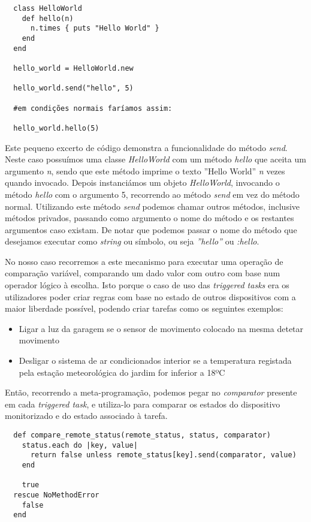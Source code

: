 \begin{verbatim}
  class HelloWorld
    def hello(n)
      n.times { puts "Hello World" }
    end
  end

  hello_world = HelloWorld.new

  hello_world.send("hello", 5)
  
  #em condições normais faríamos assim:
  
  hello_world.hello(5)
\end{verbatim}

Este pequeno excerto de código demonstra a funcionalidade do método \textit{send}. Neste caso possuímos uma classe \textit{HelloWorld} com um método \textit{hello} que aceita um argumento \textit{n}, sendo que este método imprime o texto ''Hello World'' \textit{n} vezes quando invocado. Depois instanciámos um objeto \textit{HelloWorld}, invocando o método \textit{hello} com o argumento 5, recorrendo ao método \textit{send} em vez do método normal. Utilizando este método \textit{send} podemos chamar outros métodos, inclusive métodos privados, passando como argumento o nome do método e os restantes argumentos caso existam. De notar que podemos passar o nome do método que desejamos executar como \textit{string} ou símbolo, ou seja \textit{''hello''} ou \textit{:hello}.

No nosso caso recorremos a este mecanismo para executar uma operação de comparação variável, comparando um dado valor com outro com base num operador lógico à escolha. Isto porque o caso de uso das \textit{triggered tasks} era os utilizadores poder criar regras com base no estado de outros dispositivos com a maior liberdade possível, podendo criar tarefas como os seguintes exemplos:
\begin{itemize}
  \item Ligar a luz da garagem se o sensor de movimento colocado na mesma detetar movimento
  \item Desligar o sistema de ar condicionados interior se a temperatura registada pela estação meteorológica do jardim for inferior a 18ºC
\end{itemize}

Então, recorrendo a meta-programação, podemos pegar no \textit{comparator} presente em cada \textit{triggered task}, e utiliza-lo para comparar os estados do dispositivo monitorizado e do estado associado à tarefa.

\begin{verbatim}
  def compare_remote_status(remote_status, status, comparator)
    status.each do |key, value|
      return false unless remote_status[key].send(comparator, value)
    end

    true
  rescue NoMethodError
    false
  end
\end{verbatim}


